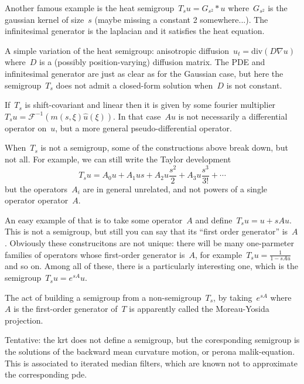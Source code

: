 \documentclass[12pt]{article}                  %
\begin{document}
Another famous example is the heat semigroup~$T_su=G_{s^2} * u$
where~$G_{s^2}$ is the gaussian kernel of size~$s$ (maybe missing a constant
2 somewhere...).  The infinitesimal generator is the laplacian and it
satisfies the heat equation.

A simple variation of the heat semigroup:  anisotropic
diffusion~$u_t=\mathrm{div}\left(D\nabla u\right)$ where~$D$ is a (possibly
position-varying) diffusion matrix.  The PDE and infinitesimal generator are
just as clear as for the Gaussian case, but here the semigroup~$T_s$ does not
admit a closed-form solution when~$D$ is not constant.

If~$T_s$ is shift-covariant and linear then it is given by some fourier
multiplier~$T_su=\mathcal{F}^{-1}(m(s,\xi)\hat{u}(\xi))$.  In that case~$Au$
is not necessarily a differential operator on~$u$, but a more general
pseudo-differential operator.

\bigskip

When~$T_s$ is not a semigroup, some of the constructions above break down,
but not all.  For example, we can still write the Taylor development
\[
	T_su = A_0u + A_1us+A_2u\frac{s^2}2+A_3u\frac{s^3}{3!}+\cdots
\]
but the operators~$A_i$ are in general unrelated, and not powers of a single
operator operator~$A$.

An easy example of that is to take some operator~$A$ and
define~$T_su=u+sAu$.  This is not a semigroup, but still you can say that
its ``first order generator'' is~$A$.  Obviously these construcitons are not
unique: there will be many one-parmeter families of operators whose
first-order generator is~$A$, for example~$T_su=\frac{1}{1-sAu}$ and so on.
Among all of these, there is a particularly interesting one, which is the
semigroup~$T_su=e^{sA}u$.

The act of building a semigroup from a non-semigroup~$T_s$, by
taking~$e^{sA}$ where~$A$ is the first-order generator of~$T$ is apparently
called the Moreau-Yosida projection.

Tentative: the krt does not define a semigroup, but the coresponding
semigroup is the solutions of the backward mean curvature motion, or perona
malik-equation.  This is associated to iterated median filters, which are
known not to approximate the corresponding pde.
\end{document}
